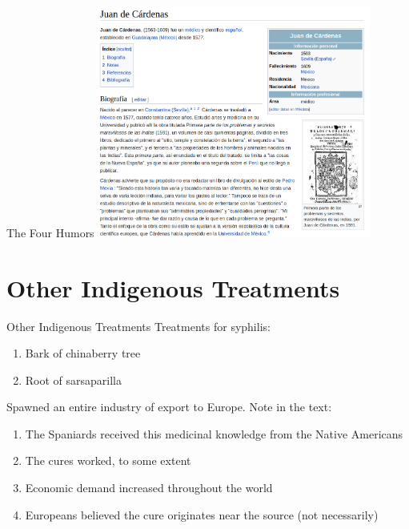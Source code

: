 \documentclass{beamer}
\begin{document}
\begin{frame}{The Four Humors}
\includegraphics[width=9cm]{figures/cardenas.png}
\end{frame}

\section{Other Indigenous Treatments}


\begin{frame}{Other Indigenous Treatments}
Treatments for syphilis:
\begin{enumerate}
\item Bark of chinaberry tree
\item Root of sarsaparilla
\end{enumerate}
Spawned an entire industry of export to Europe.  Note in the text:
\begin{enumerate}
\item The Spaniards received this medicinal knowledge from the Native Americans
\item The cures worked, to some extent
\item Economic demand increased throughout the world
\item Europeans believed the cure originates near the source (not necessarily)
\end{enumerate}
\end{frame}
\end{document}
